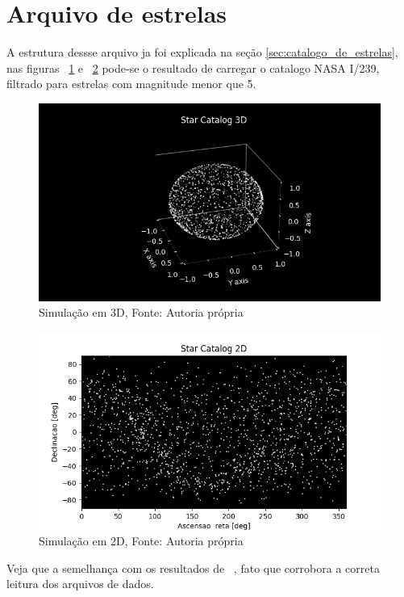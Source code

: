 \section{Arquivo de estrelas}

A estrutura dessse arquivo ja foi explicada na seção \ref{sec:catalogo_de_estrelas}, 
nas figuras ~\ref{fig:my_3D} e ~\ref{fig:my_2D} pode-se o resultado de carregar o catalogo NASA I/239, filtrado para estrelas com magnitude menor que 5.

\begin{figure}[H]
    \centering
    \includegraphics[width=1\columnwidth]{images/my_3D.png}
    \caption{Simulação em 3D, Fonte: Autoria própria}
    \label{fig:my_3D}
\end{figure}

\begin{figure}[H]
    \centering
    \includegraphics[width=1\columnwidth]{images/my_2D.png}
    \caption{Simulação em 2D, Fonte: Autoria própria}
    \label{fig:my_2D}
\end{figure}

Veja que a semelhança com os resultados de ~\cite[]{Diaz}, 
fato que corrobora a correta leitura dos arquivos de dados.
